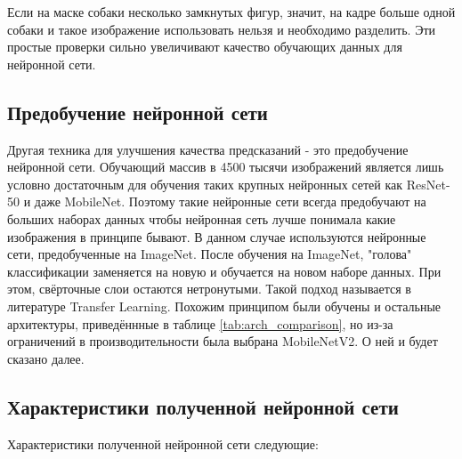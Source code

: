 Если на маске собаки несколько замкнутых фигур, значит, на кадре больше одной собаки и такое изображение использовать нельзя и необходимо разделить. Эти простые проверки сильно увеличивают качество обучающих данных для нейронной сети.

\subsection{Предобучение нейронной сети}
Другая техника для улучшения качества предсказаний - это предобучение нейронной сети. Обучающий массив в 4500 тысячи изображений является лишь условно достаточным для обучения таких крупных нейронных сетей как ResNet-50 и даже MobileNet. Поэтому такие нейронные сети всегда предобучают на больших наборах данных чтобы нейронная сеть лучше понимала какие изображения в принципе бывают. В данном случае используются нейронные сети, предобученные на ImageNet. После обучения на ImageNet, "голова" классификации заменяется на новую и обучается на новом наборе данных. При этом, свёрточные слои остаются нетронутыми. Такой подход называется в литературе Transfer Learning. Похожим принципом были обучены и остальные архитектуры, приведённные в таблице \ref{tab:arch_comparison}, но из-за ограничений в производительности была выбрана MobileNetV2. О ней и будет сказано далее.

\subsection{Характеристики полученной нейронной сети}
Характеристики полученной нейронной сети следующие:

